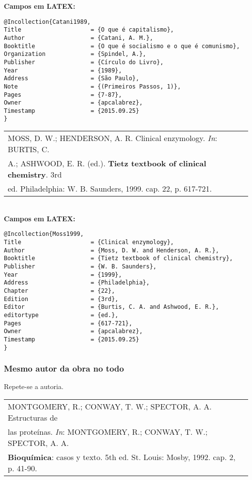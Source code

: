 \textbf{Campos em LATEX:} 

\begin{verbatim}
@Incollection{Catani1989,
Title                    = {O que é capitalismo},
Author                   = {Catani, A. M.},
Booktitle                = {O que é socialismo e o que é comunismo},
Organization             = {Spindel, A.},
Publisher                = {Círculo do Livro},
Year                     = {1989},
Address                  = {São Paulo},
Note                     = {(Primeiros Passos, 1)},
Pages                    = {7-87},
Owner                    = {apcalabrez},
Timestamp                = {2015.09.25}
}
\end{verbatim}


\begin{tabular}{|l|c|} \hline
	MOSS, D. W.; HENDERSON, A. R. Clinical enzymology. \textit{In}: BURTIS, C. \\A.; ASHWOOD, E. R. (ed.). \textbf{Tietz textbook of clinical chemistry}. 3rd\\ ed. Philadelphia: W. B. Saunders, 1999. cap. 22, p. 617-721.  \\\hline
\end{tabular} \\

\textbf{Campos em LATEX:} 

\begin{verbatim}
@Incollection{Moss1999,
Title                    = {Clinical enzymology},
Author                   = {Moss, D. W. and Henderson, A. R.},
Booktitle                = {Tietz textbook of clinical chemistry},
Publisher                = {W. B. Saunders},
Year                     = {1999},
Address                  = {Philadelphia},
Chapter                  = {22},
Edition                  = {3rd},
Editor                   = {Burtis, C. A. and Ashwood, E. R.},
editortype               = {ed.},
Pages                    = {617-721},
Owner                    = {apcalabrez},
Timestamp                = {2015.09.25}
}
\end{verbatim}

\subsubsection{Mesmo autor da obra no todo}

Repete-se a autoria. \\

\begin{tabular}{|l|c|} \hline
	MONTGOMERY, R.; CONWAY, T. W.; SPECTOR, A. A. Estructuras de \\las proteínas.  \textit{In}: MONTGOMERY, R.; CONWAY, T. W.; SPECTOR, A. A. \\
	\textbf{Bioquímica}: casos y texto. 5th ed. St. Louis:
	Mosby, 1992. cap. 2, p. 41-90.  \\\hline
\end{tabular} \\ 

